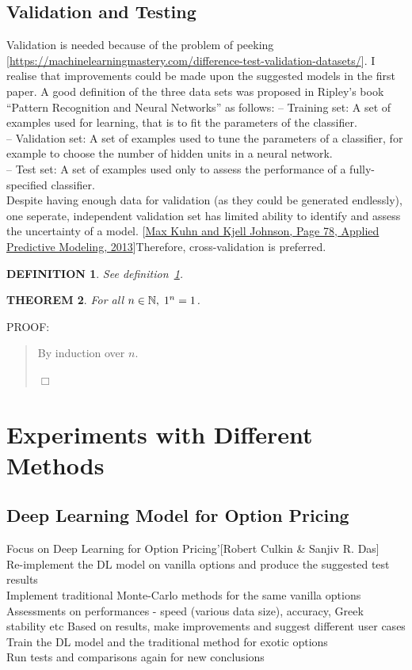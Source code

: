 \documentclass{report}
\newtheorem{theorem}{THEOREM}
\newtheorem{definition}[theorem]{DEFINITION}
\newenvironment{proof}{
PROOF:
\begin{quotation}}{
$\Box$ \end{quotation}}
\newcommand{\nats}{\mbox{\( \mathbb N \)}}
\begin{document}
\section{Validation and Testing}
Validation is needed because of the problem of peeking [\url{https://machinelearningmastery.com/difference-test-validation-datasets/}]. I realise that improvements could be made upon the suggested models in the first paper. 
A good definition of the three data sets was proposed in Ripley’s book “Pattern Recognition and Neural Networks” as follows:
– Training set: A set of examples used for learning, that is to fit the parameters of the classifier.\\
– Validation set: A set of examples used to tune the parameters of a classifier, for example to choose the number of hidden units in a neural network.\\
– Test set: A set of examples used only to assess the performance of a fully-specified classifier.\\
Despite having enough data for validation (as they could be generated endlessly), one seperate, independent validation set has limited ability to identify and assess the uncertainty of a model. [\url{Max Kuhn and Kjell Johnson, Page 78, Applied Predictive Modeling, 2013}]Therefore, cross-validation is preferred.
\begin{definition}\label{def}
See definition~\ref{def}.
\end{definition}
\begin{theorem}
For all $n\in\nats,\; 1^n=1$.
\end{theorem}
\begin{proof}
By induction over $n$.
\end{proof}

\chapter{Experiments with Different Methods}

\section{Deep Learning Model for Option Pricing}
Focus on Deep Learning for Option Pricing’[Robert Culkin & Sanjiv R. Das]\\
Re-implement the DL model on vanilla options and produce the suggested test results\\
Implement traditional Monte-Carlo methods for the same vanilla options \\
Assessments on performances - speed (various data size), accuracy, Greek stability etc
Based on results, make improvements and suggest different user cases\\
Train the DL model and the traditional method for exotic options\\
Run tests and comparisons again for new conclusions
\end{document}
